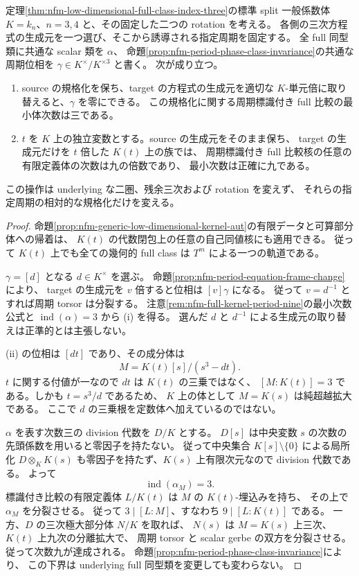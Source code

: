 \begin{theorem}[相対的な周期規格化と一般標識付き比較の次数九]
\label{thm:nfm-free-period-frame-degree-nine}
定理\ref{thm:nfm-low-dimensional-full-class-index-three}の標準 split 一般係数体
$K=k_n$、$n=3,4$ と、その固定した二つの rotation を考える。
各側の三次方程式の生成元を一つ選び、そこから誘導される指定周期を固定する。
全 full 同型類に共通な scalar 類を $\alpha$、
命題\ref{prop:nfm-period-phase-class-invariance}の共通な周期位相を
$\gamma\in K^\times/K^{\times3}$ と書く。
次が成り立つ。
\begin{enumerate}[label=\textup{(\roman*)}]
\item source の規格化を保ち、target の方程式の生成元を適切な
      $K$-単元倍に取り替えると、$\gamma$ を零にできる。
      この規格化に関する周期標識付き full 比較の最小体次数は三である。
\item $t$ を $K$ 上の独立変数とする。source の生成元をそのまま保ち、
      target の生成元だけを $t$ 倍した $K(t)$ 上の族では、
      周期標識付き full 比較核の任意の有限定義体の次数は九の倍数であり、
      最小次数は正確に九である。
\end{enumerate}
この操作は underlying な二圏、残余三次および rotation を変えず、
それらの指定周期の相対的な規格化だけを変える。
\end{theorem}

\begin{proof}
命題\ref{prop:nfm-generic-low-dimensional-kernel-aut}の有限データと可算部分体への帰着は、
$K(t)$ の代数閉包上の任意の自己同値核にも適用できる。
従って $K(t)$ 上でも全ての幾何的 full class は $T^m$ による一つの軌道である。

$\gamma=[d]$ となる $d\in K^\times$ を選ぶ。
命題\ref{prop:nfm-period-equation-frame-change}により、
target の生成元を $v$ 倍すると位相は $[v]\gamma$ になる。
従って $v=d^{-1}$ とすれば周期 torsor は分裂する。
注意\ref{rem:nfm-full-kernel-period-nine}の最小次数公式と
$\operatorname{ind}(\alpha)=3$ から \textup{(i)} を得る。
選んだ $d$ と $d^{-1}$ による生成元の取り替えは正準的とは主張しない。

\textup{(ii)} の位相は $[dt]$ であり、その成分体は
\[
 M=K(t)[s]/(s^3-dt).
\]
$t$ に関する付値が一なので $dt$ は $K(t)$ の三乗ではなく、
$[M:K(t)]=3$ である。しかも $t=s^3/d$ であるため、
$K$ 上の体として $M=K(s)$ は純超越拡大である。
ここで $d$ の三乗根を定数体へ加えているのではない。

$\alpha$ を表す次数三の division 代数を $D/K$ とする。
$D[s]$ は中央変数 $s$ の次数の先頭係数を用いると零因子を持たない。
従って中央集合 $K[s]\setminus\{0\}$ による局所化
$D\otimes_K K(s)$ も零因子を持たず、$K(s)$ 上有限次元なので division 代数である。
よって
\[
 \operatorname{ind}(\alpha_M)=3.
\]
標識付き比較の有限定義体 $L/K(t)$ は $M$ の $K(t)$-埋込みを持ち、
その上で $\alpha_M$ を分裂させる。
従って $3\mid[L:M]$、すなわち $9\mid[L:K(t)]$ である。
一方、$D$ の三次極大部分体 $N/K$ を取れば、
$N(s)$ は $M=K(s)$ 上三次、$K(t)$ 上九次の分離拡大で、
周期 torsor と scalar gerbe の双方を分裂させる。
従って次数九が達成される。
命題\ref{prop:nfm-period-phase-class-invariance}により、
この下界は underlying full 同型類を変更しても変わらない。
\end{proof}

